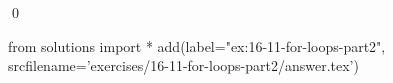 
\begin{ex}
  \label{ex:16-11-for-loops-part2}
  
  \qed
\end{ex}
\begin{python0}
from solutions import *
add(label="ex:16-11-for-loops-part2",
    srcfilename='exercises/16-11-for-loops-part2/answer.tex')
\end{python0}
